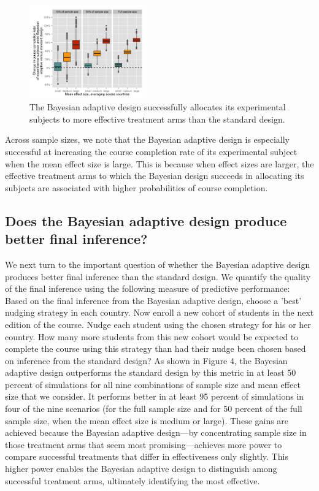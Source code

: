 \documentclass{acm_proc_article-sp}
\begin{document}
\begin{figure}
\centering
\includegraphics[width=0.45\textwidth]{fig3}
\caption{The Bayesian adaptive design successfully allocates its experimental subjects to more effective treatment arms than the standard design.}
\label{fig:3}
\end{figure}

Across sample sizes, we note that the Bayesian adaptive design is especially successful at increasing the course completion rate of its experimental subject when the mean effect size is large. This is because when effect sizes are larger, the effective treatment arms to which the Bayesian design succeeds in allocating its subjects are associated with higher probabilities of course completion. 

\subsection{Does the Bayesian adaptive design produce better final inference?}
We next turn to the important question of whether the Bayesian adaptive design produces better final inference than the standard design. We quantify the quality of the final inference using the following measure of predictive performance: Based on the final inference from the Bayesian adaptive design, choose a 'best' nudging strategy in each country. Now enroll a new cohort of students in the next edition of the course. Nudge each student using the chosen strategy for his or her country. How many more students from this new cohort would be expected to complete the course using this strategy than had their nudge been chosen based on inference from the standard design? 
As shown in Figure 4, the Bayesian adaptive design outperforms the standard design by this metric in at least 50 percent of simulations for all nine combinations of sample size and mean effect size that we consider. It performs better in at least 95 percent of simulations in four of the nine scenarios (for the full sample size and for 50 percent of the full sample size, when the mean effect size is medium or large). These gains are achieved because the Bayesian adaptive design—by concentrating sample size in those treatment arms that seem most promising—achieves more power to compare successful treatments that differ in effectiveness only slightly. This higher power enables the Bayesian adaptive design to distinguish among successful treatment arms, ultimately identifying the most effective. 
\end{document}
